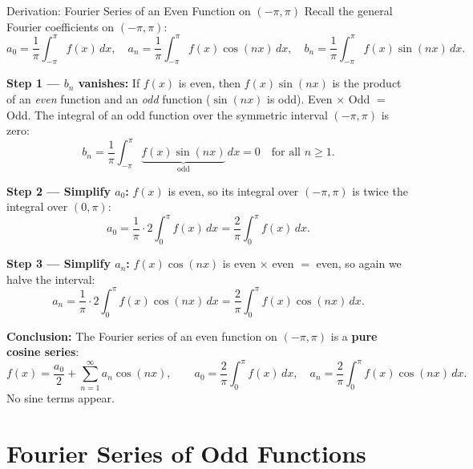 \documentclass[12pt,a4paper]{article}
\begin{document}
\begin{infobox}{Derivation: Fourier Series of an Even Function on $(-\pi,\pi)$}
Recall the general Fourier coefficients on $(-\pi, \pi)$:
\[
  a_0 = \frac{1}{\pi}\int_{-\pi}^{\pi} f(x)\,dx, \quad
  a_n = \frac{1}{\pi}\int_{-\pi}^{\pi} f(x)\cos(nx)\,dx, \quad
  b_n = \frac{1}{\pi}\int_{-\pi}^{\pi} f(x)\sin(nx)\,dx.
\]

\textbf{Step 1 --- $b_n$ vanishes:}
If $f(x)$ is even, then $f(x)\sin(nx)$ is the product of an \emph{even} function and an
\emph{odd} function ($\sin(nx)$ is odd). Even $\times$ Odd $=$ Odd. The integral of an odd
function over the symmetric interval $(-\pi,\pi)$ is zero:
\[
  b_n = \frac{1}{\pi}\int_{-\pi}^{\pi} \underbrace{f(x)\sin(nx)}_{\text{odd}} \,dx = 0
  \quad \text{for all } n \geq 1.
\]

\textbf{Step 2 --- Simplify $a_0$:}
$f(x)$ is even, so its integral over $(-\pi,\pi)$ is twice the integral over $(0,\pi)$:
\[
  a_0 = \frac{1}{\pi}\cdot 2\int_{0}^{\pi} f(x)\,dx
      = \frac{2}{\pi}\int_{0}^{\pi} f(x)\,dx.
\]

\textbf{Step 3 --- Simplify $a_n$:}
$f(x)\cos(nx)$ is even $\times$ even $=$ even, so again we halve the interval:
\[
  a_n = \frac{1}{\pi}\cdot 2\int_{0}^{\pi} f(x)\cos(nx)\,dx
      = \frac{2}{\pi}\int_{0}^{\pi} f(x)\cos(nx)\,dx.
\]

\textbf{Conclusion:} The Fourier series of an even function on $(-\pi,\pi)$ is a
\textbf{pure cosine series}:
\[
  \boxed{f(x) = \frac{a_0}{2} + \sum_{n=1}^{\infty} a_n\cos(nx),}
  \qquad
  a_0 = \frac{2}{\pi}\int_{0}^{\pi} f(x)\,dx, \quad
  a_n = \frac{2}{\pi}\int_{0}^{\pi} f(x)\cos(nx)\,dx.
\]
No sine terms appear.
\end{infobox}

\section{Fourier Series of Odd Functions}
\end{document}
